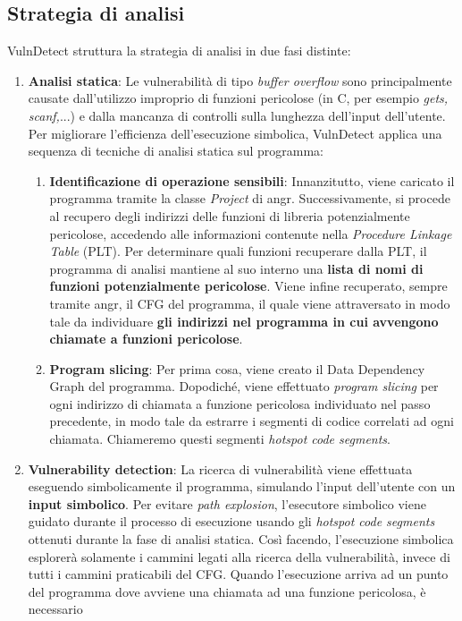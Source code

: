 \documentclass[../main.tex]{subfiles}
\begin{document}
\subsection{Strategia di analisi}
VulnDetect struttura la strategia di analisi in due fasi distinte:
\begin{enumerate}
    \item \textbf{Analisi statica}: Le vulnerabilità di tipo \textit{buffer overflow} sono principalmente causate dall'utilizzo improprio di funzioni pericolose (in C, per esempio \textit{gets, scanf,}...) e dalla mancanza di controlli
    sulla lunghezza dell'input dell'utente. Per migliorare l'efficienza dell'esecuzione simbolica, VulnDetect applica una sequenza di tecniche di analisi statica sul programma:
    \begin{enumerate}
        \item \textbf{Identificazione di operazione sensibili}: Innanzitutto, viene caricato il programma tramite la classe \textit{Project} di angr.
        Successivamente, si procede al recupero degli indirizzi delle funzioni di libreria potenzialmente pericolose, accedendo alle informazioni contenute nella \textit{Procedure Linkage Table} (PLT).
        Per determinare quali funzioni recuperare dalla PLT, il programma di analisi mantiene al suo interno una \textbf{lista di nomi di funzioni potenzialmente pericolose}.
        Viene infine recuperato, sempre tramite angr, il CFG del programma, il quale viene attraversato in modo tale da individuare \textbf{gli indirizzi nel programma in cui avvengono chiamate a funzioni pericolose}.
        \item \textbf{Program slicing}: Per prima cosa, viene creato il Data Dependency Graph del programma. Dopodiché, viene effettuato \textit{program slicing} per ogni indirizzo di chiamata a funzione pericolosa individuato nel passo precedente, in modo tale
        da estrarre i segmenti di codice correlati ad ogni chiamata. Chiameremo questi segmenti \textit{hotspot code segments}.
    \end{enumerate}
    \item \textbf{Vulnerability detection}: La ricerca di vulnerabilità viene effettuata eseguendo simbolicamente il programma, simulando l'input dell'utente con un \textbf{input simbolico}. Per evitare \textit{path explosion}, l'esecutore simbolico viene guidato durante il processo di esecuzione usando gli \textit{hotspot code segments} ottenuti
    durante la fase di analisi statica. Così facendo, l'esecuzione simbolica esplorerà solamente i cammini legati alla ricerca della vulnerabilità, invece di tutti i cammini praticabili del CFG. Quando l'esecuzione arriva ad un punto del programma dove avviene una chiamata ad una funzione pericolosa, è necessario 

\end{enumerate}
\end{document}
